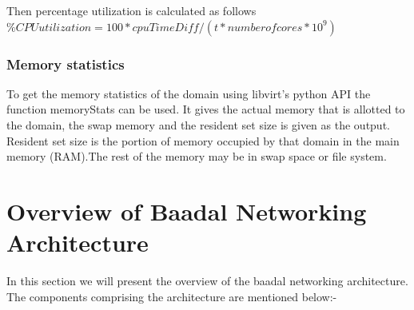 Then percentage utilization is calculated as follows \linebreak
$\%CPU utilization = 100 * cpuTimeDiff / (t * number of cores * 10^9)$

\subsubsection{Memory statistics}
To get the memory statistics of the domain using libvirt's python API the function memoryStats can be used. It gives the actual memory that is allotted to the domain, the swap memory and the resident set size is given as the output. Resident set size is the portion of memory occupied by that domain in the main memory (RAM).The rest of the memory may be in swap space or file system. 

\section{Overview of Baadal Networking Architecture}
In this section we will present the overview of the baadal networking architecture. The components comprising the architecture are mentioned below:-

